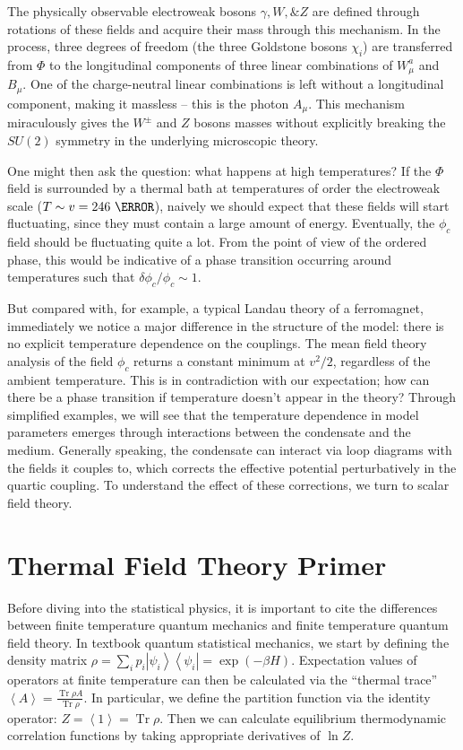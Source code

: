 \documentclass[%
 reprint,
nofootinbib,
 amsmath,amssymb,
 aps,
floatfix,
]{revtex4-1}
\DeclareMathOperator{\Tr}{Tr}
\begin{document}
The physically observable electroweak bosons $\gamma, W, \& Z$ are defined through rotations of these fields and acquire their mass through this mechanism.
In the process, three degrees of freedom (the three Goldstone bosons $\chi_i$) are transferred from $\Phi$ to the longitudinal components of three linear combinations of $W_\mu^a$ and $B_\mu$.
One of the charge-neutral linear combinations is left without a longitudinal component, making it massless -- this is the photon $A_\mu$.
This mechanism miraculously gives the $W^\pm$ and $Z$ bosons masses without explicitly breaking the $SU(2)$ symmetry in the underlying microscopic theory.

One might then ask the question: what happens at high temperatures?
If the $\Phi$ field is surrounded by a thermal bath at temperatures of order the electroweak scale ($T\sim v=246~\GeV$), naively we should expect that these fields will start fluctuating, since they must contain a large amount of energy.
Eventually, the $\phi_c$ field should be fluctuating quite a lot.
From the point of view of the ordered phase, this would be indicative of a phase transition occurring around temperatures such that $\delta\phi_c/\phi_c \sim 1$.

But compared with, for example, a typical Landau theory of a ferromagnet, immediately we notice a major difference in the structure of the model: there is no explicit temperature dependence on the couplings.
The mean field theory analysis of the field $\phi_c$ returns a constant minimum at $v^2/2$, regardless of the ambient temperature.
This is in contradiction with our expectation; how can there be a phase transition if temperature doesn't appear in the theory?
Through simplified examples, we will see that the temperature dependence in model parameters emerges through interactions between the condensate and the medium.
Generally speaking, the condensate can interact via loop diagrams with the fields it couples to, which corrects the effective potential perturbatively in the quartic coupling.
To understand the effect of these corrections, we turn to scalar field theory.

\section{\label{sec:ftqft}Thermal Field Theory Primer}
Before diving into the statistical physics, it is important to cite the differences between finite temperature quantum mechanics and finite temperature quantum field theory.
In textbook quantum statistical mechanics, we start by defining the density matrix $\rho=\sum_{i}p_i\left|\psi_i\right>\left<\psi_i\right|=\exp\left(-\beta H\right)$.
Expectation values of operators at finite temperature can then be calculated via the ``thermal trace'' $\left<A\right> = \frac{\Tr \rho A}{\Tr \rho}$.
In particular, we define the partition function via the identity operator: $Z = \left<1\right> = \Tr \rho$.
Then we can calculate equilibrium thermodynamic correlation functions by taking appropriate derivatives of $\ln Z$.
\end{document}
